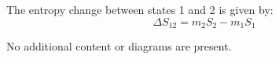 The entropy change between states 1 and 2 is given by:  
\[
\Delta S_{12} = m_2 S_2 - m_1 S_1
\]  

No additional content or diagrams are present.
